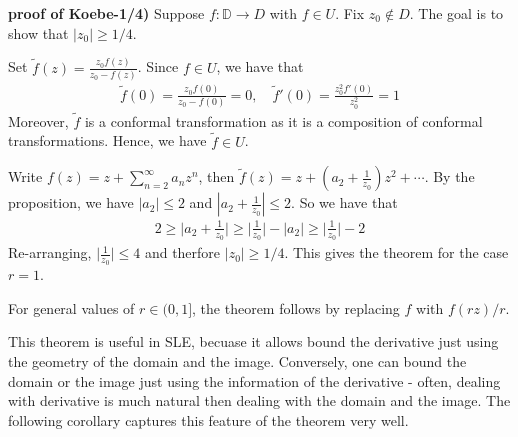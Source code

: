 \documentclass[12pt,a4paper]{article}
\newenvironment{proof}
{\begin{changemargin}{0.5cm}{0.5cm} 
	}%
	{\end{changemargin}
}
\begin{document}
\begin{proof}
\textbf{proof of Koebe-1/4)} Suppose $f: \mathbb{D} \rightarrow D$ with $f\in U$. Fix $z_0 \not\in D$. The goal is to show that $|z_0| \geq 1/4$.

\quad Set $\tilde{f}(z) = \frac{z_0f(z)}{z_0- f(z)}$. Since $f\in U$, we have that
\begin{align*}
\tilde{f}(0) = \frac{z_0 f(0)}{z_0 - f(0)}=0, \quad \tilde{f}'(0)= \frac{z_0^2 f'(0)}{z_0^2} =1
\end{align*}
Moreover, $\tilde{f}$ is a conformal transformation as it is a composition of conformal transformations. Hence, we have $\tilde{f} \in U$.

\quad Write $f(z) = z + \sum_{n=2}^{\infty} a_n z^n$, then $\tilde{f}(z) = z+ (a_2 + \frac{1}{z_0})z^2 + \cdots$. By the proposition, we have $|a_2|\leq 2$ and $|a_2 + \frac{1}{z_0}|\leq 2$. So we have that
\begin{align*}
2\geq \Big|a_2 + \frac{1}{z_0}\Big| \geq \Big| \frac{1}{z_0} \Big| - |a_2| \geq \Big| \frac{1}{z_0} \Big| -2 
\end{align*}
Re-arranging, $\Big| \frac{1}{z_0}\Big| \leq 4$ and therfore $|z_0| \geq 1/4$. This gives the theorem for the case $r=1$.

\quad For general values of $r\in (0,1]$, the theorem follows by replacing $f$ with $f(rz)/r$.

\eop
\end{proof}

This theorem is useful in SLE, becuase it allows bound the derivative just using the geometry of the domain and the image. Conversely, one can bound the domain or the image just using the information of the derivative - often, dealing with derivative is much natural then dealing with the domain and the image. The following corollary captures this feature of the theorem very well.
\s
\end{document}
